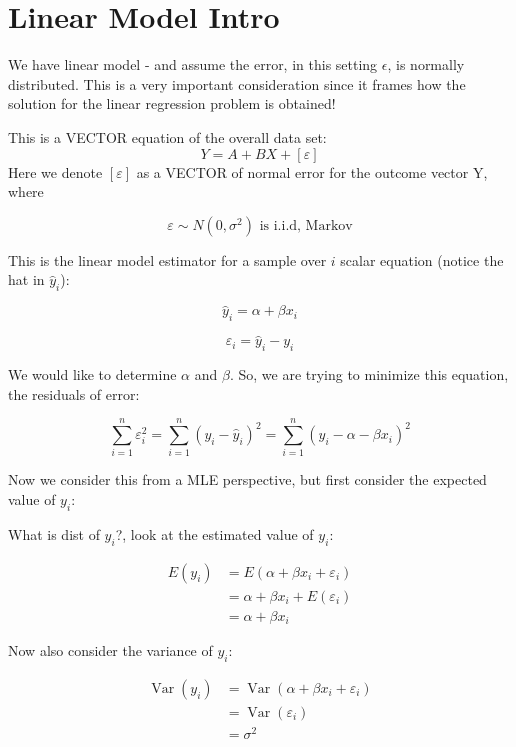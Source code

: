 \documentclass[
  12 pt,
  a4paper,
]{book}
\numberwithin{equation}{section}
\theoremstyle{plain}      %
\theoremstyle{definition} %
\theoremstyle{remark}     %
\theoremstyle{note}         %
\begin{document}
\hypertarget{linear-model-intro}{%
\section{Linear Model Intro}\label{linear-model-intro}}

We have linear model - and assume the error, in this setting
\(\epsilon\), is normally distributed. This is a very important
consideration since it frames how the solution for the linear regression
problem is obtained!

This is a VECTOR equation of the overall data set: \[
Y=A+B X + [\varepsilon]
\] Here we denote \([\varepsilon]\) as a VECTOR of normal error for the
outcome vector Y, where

\[
\varepsilon \sim N\left(0, \sigma^{2}\right) \text{ is i.i.d, Markov}
\]

This is the linear model estimator for a sample over \(i\) scalar
equation (notice the hat in \(\hat{y}_{i}\)):

\[
\hat{y}_{i}=\alpha+\beta x_{i}
\]

\[
\varepsilon_{i} = \hat{y}_{i}-y_{i}
\]

We would like to determine \(\alpha\) and \(\beta\). So, we are trying
to minimize this equation, the residuals of error:

\[
\sum_{i=1}^{n}\varepsilon_{i}^{2} = \sum_{i=1}^{n}\left(y_{i}-\hat{y}_{i}\right)^{2} = \sum_{i=1}^{n}\left(y_{i}-\alpha-\beta x_{i}\right)^{2}
\]

Now we consider this from a MLE perspective, but first consider the
expected value of \(y_{i}\):

What is dist of \(y_{i}\)?, look at the estimated value of \(y_{i}\):

\[
\begin{aligned}
E\left(y_{i}\right)&=E\left(\alpha+\beta x_{i}+\varepsilon_{i}\right)\\
&=\alpha+\beta x_{i}+E\left(\varepsilon_{i}\right) \\
&=\alpha+\beta x_{i}
\end{aligned}
\]

Now also consider the variance of \(y_{i}\):

\[
\begin{aligned}
\operatorname{Var}\left(y_{i}\right) &=\operatorname{Var}\left(\alpha+\beta x_{i}+\varepsilon_{i}\right) \\
&=\operatorname{Var}\left(\varepsilon_{i}\right) \\
&=\sigma^{2}
\end{aligned}
\]
\end{document}
